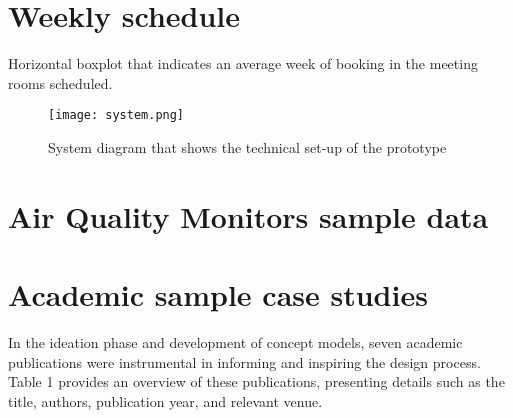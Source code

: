 \begin{appendices}
\section{Weekly schedule}
\label{sec:apx:first_appendix}

Horizontal boxplot that indicates an average week of booking in the meeting rooms scheduled.

\begin{figure}[H]
    \centering
    \texttt{[image: system.png]}
    \caption{System diagram that shows the technical set-up of the prototype}
    \label{fig:timeline}
\end{figure}

\pagebreak

\section{Air Quality Monitors sample data}
\label{sec:apx:first_appendix}

\section{Academic sample case studies}

In the ideation phase and development of concept models, seven academic publications were instrumental in informing and inspiring the design process. Table 1 provides an overview of these publications, presenting details such as the title, authors, publication year, and relevant venue.


\end{appendices}
